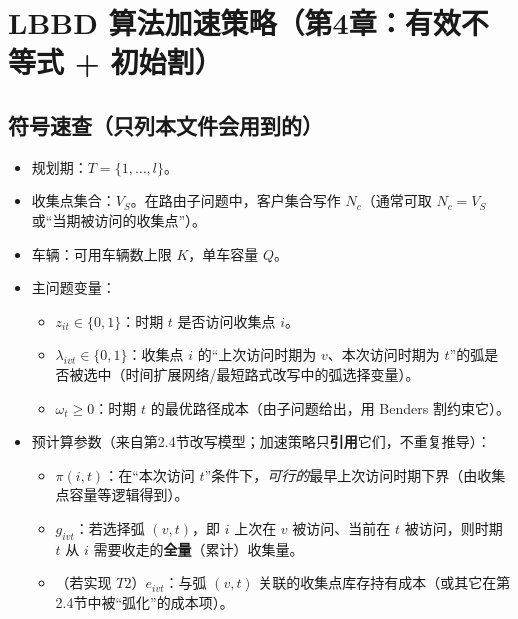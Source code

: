 \documentclass{article}
\begin{document}

\section{LBBD 算法加速策略（第4章：有效不等式 + 初始割）}

\subsection{符号速查（只列本文件会用到的）}

\begin{itemize}[leftmargin=2em]
  \item 规划期：$T=\{1,\dots,l\}$。
  \item 收集点集合：$V_S$。在路由子问题中，客户集合写作 $N_c$（通常可取 $N_c=V_S$ 或“当期被访问的收集点”）。
  \item 车辆：可用车辆数上限 $K$，单车容量 $Q$。
  \item 主问题变量：
    \begin{itemize}[leftmargin=2em]
      \item $z_{it}\in\{0,1\}$：时期 $t$ 是否访问收集点 $i$。
      \item $\lambda_{ivt}\in\{0,1\}$：收集点 $i$ 的“上次访问时期为 $v$、本次访问时期为 $t$”的弧是否被选中（时间扩展网络/最短路式改写中的弧选择变量）。
      \item $\omega_t\ge 0$：时期 $t$ 的最优路径成本（由子问题给出，用 Benders 割约束它）。
    \end{itemize}
  \item 预计算参数（来自第2.4节改写模型；加速策略只\textbf{引用}它们，不重复推导）：
    \begin{itemize}[leftmargin=2em]
      \item $\pi(i,t)$：在“本次访问 $t$”条件下，\emph{可行的}最早上次访问时期下界（由收集点容量等逻辑得到）。
      \item $g_{ivt}$：若选择弧 $(v,t)$，即 $i$ 上次在 $v$ 被访问、当前在 $t$ 被访问，则时期 $t$ 从 $i$ 需要收走的\textbf{全量}（累计）收集量。
      \item （若实现 $T2$）$e_{ivt}$：与弧 $(v,t)$ 关联的收集点库存持有成本（或其它在第2.4节中被“弧化”的成本项）。
    \end{itemize}
\end{itemize}
\end{document}
